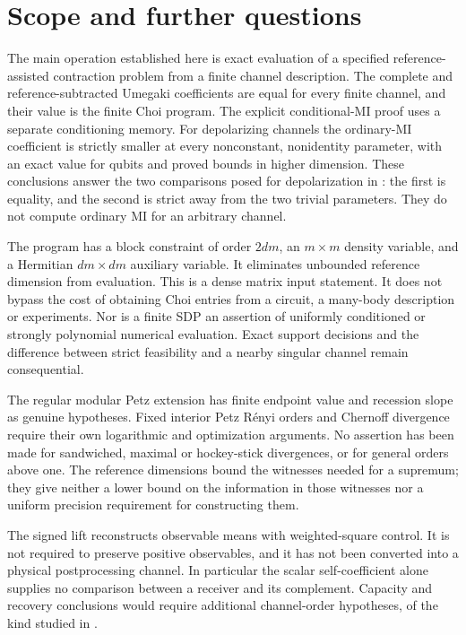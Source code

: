 \documentclass[11pt]{article}
\numberwithin{equation}{section}
\theoremstyle{definition}
\theoremstyle{remark}
\begin{document}
\section{Scope and further questions}
\label{sec:discussion}

The main operation established here is exact evaluation of a specified
reference-assisted contraction problem from a finite channel description.
The complete and reference-subtracted Umegaki coefficients are equal
for every finite channel, and their value is the finite Choi program.
The explicit conditional-MI proof uses a separate conditioning memory.
For depolarizing channels the ordinary-MI coefficient is strictly smaller
at every nonconstant, nonidentity parameter, with an exact value for
qubits and proved bounds in higher dimension. These conclusions answer
the two comparisons posed for depolarization in
\cite[Section~3.3, equation~(3.66)]{HGNW26}: the first is equality,
and the second is strict away from the two trivial parameters.
They do not compute ordinary MI for an arbitrary channel.

The program has a block constraint of order $2dm$, an $m\times m$
density variable, and a Hermitian $dm\times dm$ auxiliary variable.
It eliminates unbounded reference dimension from evaluation.
This is a dense matrix input statement. It does not bypass the cost
of obtaining Choi entries from a circuit, a many-body description or
experiments. Nor is a finite SDP an assertion of uniformly conditioned
or strongly polynomial numerical evaluation. Exact support decisions
and the difference between strict feasibility and a nearby singular
channel remain consequential.

The regular modular Petz extension has finite endpoint value and recession
slope as genuine hypotheses. Fixed interior Petz R\'enyi orders and
Chernoff divergence require their own logarithmic and optimization
arguments. No assertion has been made for sandwiched, maximal or
hockey-stick divergences, or for general orders above one. The reference
dimensions bound the witnesses needed for a supremum; they give neither
a lower bound on the information in those witnesses nor a uniform
precision requirement for constructing them.

The signed lift reconstructs observable means with weighted-square
control. It is not required to preserve positive observables, and it
has not been converted into a physical postprocessing channel.
In particular the scalar self-coefficient alone supplies no comparison
between a receiver and its complement. Capacity and recovery conclusions
would require additional channel-order hypotheses, of the kind studied
in \cite{ZW26v3,Hirche26}.
\end{document}
